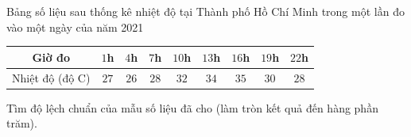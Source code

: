 \begin{ex}%
	Bảng số liệu sau thống kê nhiệt độ tại Thành phố Hồ Chí Minh trong một lần đo vào một ngày của năm 2021 
	\begin{center}
		\begin{tabular}{|c|c|c|c|c|c|c|c|c|}
	\hline
	Giờ đo			& $1$h & $4$h & $7$h & $10$h & $13$h & $16$h & $19$h & $22$h \\
	\hline
	Nhiệt độ (độ C)	& $27$ & $26$ & $28$ & $32$ & $34$ & $35$ & $30$ & $28$ \\
	\hline
	\end{tabular}
	\end{center}
	Tìm độ lệch chuẩn của mẫu số liệu đã cho (làm tròn kết quả đến hàng phần trăm).
\end{ex}

